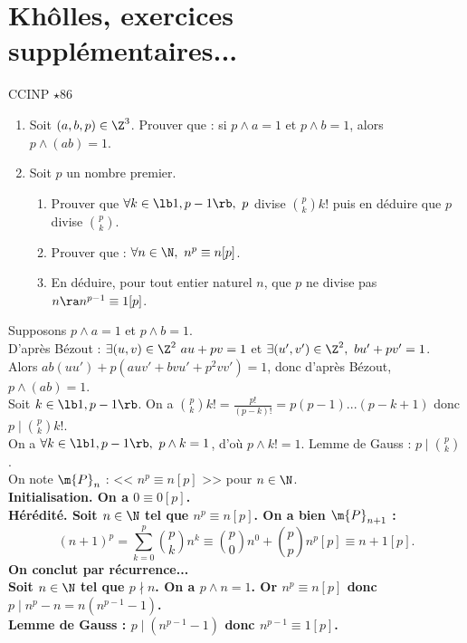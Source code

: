 \documentclass[11pt]{article}
\begin{document}
\pagebreak

\section{Khôlles, exercices supplémentaires...}


\begin{exercice}{CCINP $\star$}{86}
    \begin{enumerate}
        \item Soit $(a,b,p)\in\Z^3$. Prouver que : si $p\land a=1$ et $p\land b=1$, alors $p\land(ab)=1$.
        \item Soit $p$ un nombre premier.
        \begin{enumerate}
            \item Prouver que $\forall k \in \lb1,p-1\rb, ~ p$ divise $\binom{p}{k}k!$ puis en déduire que $p$ divise $\binom{p}{k}$.
            \item Prouver que : $\forall n \in \N, ~ n^p\equiv n[p]$.
            \item En déduire, pour tout entier naturel $n$, que $p$ ne divise pas $n\ra n^{p-1}\equiv1[p]$.
        \end{enumerate}
    \end{enumerate}
    \tcblower
     Supposons $p\land a = 1$ et $p\land b=1$.\\
    D'après Bézout : $\exists (u,v)\in\Z^2 ~ au+pv=1$ et $\exists (u',v')\in\Z^2, ~ bu'+pv'=1$.\\
    Alors $ab(uu')+p(auv'+bvu'+p^2vv')=1$, donc d'après Bézout, $p\land(ab)=1$.\\
     Soit $k\in\lb1,p-1\rb$. On a $\binom{p}{k}k!=\frac{p!}{(p-k)!}=p(p-1)...(p-k+1)$ donc $p\mid\binom{p}{k}k!$.\\
    On a $\forall k \in \lb 1, p-1\rb, ~ p \land k = 1$, d'où $p\land k! = 1$. Lemme de Gauss : $p\mid \binom{p}{k}$.\\
     On note $\m{P}_n$ : << $n^p\equiv n[p]$ >> pour $n\in\N$.\\
    \bf{Initialisation.} On a $0\equiv0[p]$.\\
    \bf{Hérédité.} Soit $n\in\N$ tel que $n^p\equiv n[p]$. On a bien $\m{P}_{n+1}$ :
    \begin{equation*}
        (n+1)^p=\sum_{k=0}^p\binom{p}{k}n^k\equiv\binom{p}{0}n^0+\binom{p}{p}n^p[p]\equiv n+1[p].
    \end{equation*}
    On conclut par récurrence...\\
     Soit $n\in\N$ tel que $p\nmid n$. On a $p\land n=1$. Or $n^p\equiv n[p]$ donc $p\mid n^p-n=n(n^{p-1}-1)$.\\
    Lemme de Gauss : $p\mid (n^{p-1}-1)$ donc $n^{p-1}\equiv1[p]$.
\end{exercice}
\end{document}

